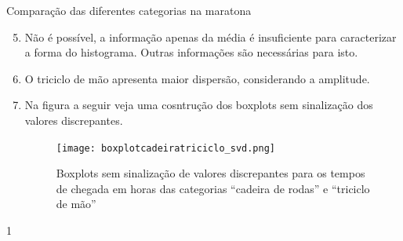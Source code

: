 \clearmargin
\begin{answer}{Comparação das diferentes categorias na maratona}
{
\begin{enumerate}\setcounter{enumi}{4}
\item Não é possível, a informação apenas da média é insuficiente para caracterizar a forma do histograma. Outras informações são necessárias para isto.
\item O triciclo de mão apresenta maior dispersão, considerando a amplitude.
\item Na figura a seguir veja uma cosntrução dos boxplots sem sinalização dos valores discrepantes.
\begin{figure}[H]
\centering

\texttt{[image: boxplotcadeiratriciclo\_svd.png]}
\caption{Boxplots sem sinalização de valores discrepantes para os tempos de chegada em horas das categorias “cadeira de rodas”{} e “triciclo de mão”}
\label{}
\end{figure}
\end{enumerate}
}{1}
\end{answer}


